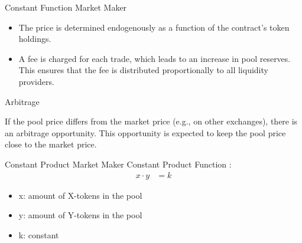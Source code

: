 \documentclass[handout]{beamer}
\begin{document}
\begin{frame}{Constant Function Market Maker}

	\begin{figure}	
		\centering
		
	\end{figure}

	\begin{itemize}
		\item<5-> The price is determined endogenously as a function of the contract's token holdings.
		\item<6-> A fee is charged for each trade, which leads to an increase in pool reserves. This ensures that the fee is distributed proportionally to all liquidity providers.
	\end{itemize}


\end{frame}


\begin{frame}{Arbitrage}
	\begin{figure}
		
	\end{figure}
		
		If the pool price differs from the market price (e.g., on other exchanges), there is an arbitrage opportunity. This opportunity is expected to keep the pool price close to the market price.
\end{frame}


\begin{frame}{Constant Product Market Maker}
Constant Product Function \cite{UNIV2}:
	\begin{align*}
		x \cdot y &= k
	\end{align*}

	\begin{itemize}
		\item[] x: amount of X-tokens in the pool
		\item[] y: amount of Y-tokens in the pool
		\item[] k: constant
	\end{itemize}
	\vspace{1cm}
\end{frame}
\end{document}
